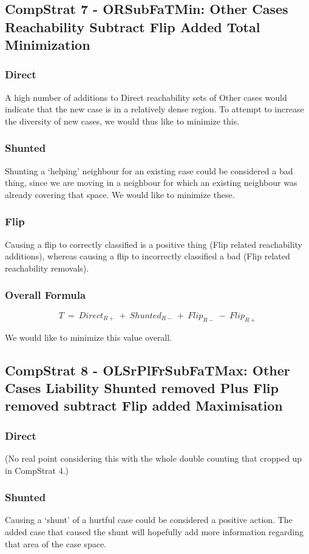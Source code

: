 \documentclass[a4paper,11pt]{report}
\begin{document}
\subsection{CompStrat 7 - ORSubFaTMin: Other Cases Reachability Subtract Flip Added Total Minimization}
\subsubsection{Direct}
A high number of additions to Direct reachability sets of Other cases would indicate that the new case is in a relatively dense region. To attempt to increase the diversity of new cases, we would thus like to minimize this.

\subsubsection{Shunted}
Shunting a `helping' neighbour for an existing case could be considered a bad thing, since we are moving in a neighbour for which an existing neighbour was already covering that space. We would like to minimize these.

\subsubsection{Flip}
Causing a flip to correctly classified is a positive thing (Flip related reachability additions), whereas causing a flip to incorrectly classified a bad (Flip related reachability removals).

\subsubsection{Overall Formula}
\[  
  T~=~Direct_{R+}~+~Shunted_{R-}~+~Flip_{R-}~-~Flip_{R+}
\]

We would like to minimize this value overall.

\subsection{CompStrat 8 - OLSrPlFrSubFaTMax: Other Cases Liability Shunted removed Plus Flip removed subtract Flip added Maximisation}
\subsubsection{Direct}
(No real point considering this with the whole double counting that cropped up in CompStrat 4.)

\subsubsection{Shunted}
Causing a `shunt' of a hurtful case could be considered a positive action. The added case that caused the shunt will hopefully add more information regarding that area of the case space. 
\end{document}
